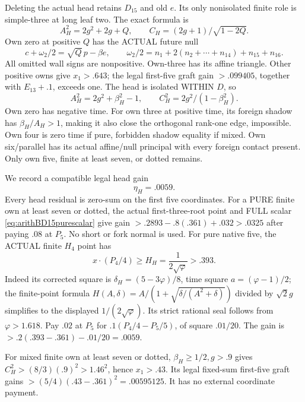 \documentclass[11pt]{article}
\begin{document}
Deleting the actual head retains \(D_{15}\)
and old \(e\).
Its only nonisolated finite role is
simple-three at long leaf two.
The exact formula is
\[
 A_H^2=2g^2+2g+Q,\qquad
                      C_H=(2g+1)/\sqrt{1-2Q}.
\]
Own zero at positive \(Q\) has the
ACTUAL future null
\[
 c+\omega_2/2=\sqrt Q\,p-\beta e,\qquad
 \omega_2/2=n_1+2(n_2+\cdots+n_{14})+n_{15}+n_{16}.
\]
All omitted wall signs are nonpositive.
Own-three has its affine triangle.
Other positive owns give \(x_1>.643\);
the legal first-five graft gain \(>.099405\),
together with \(E_{13}+.1\), exceeds one.
The head is isolated WITHIN \(D\), so
\[
 A_H^2=2g^2+\beta_H^2-1,\qquad
                         C_H^2=2g^2/(1-\beta_H^2).
\]
Own zero has negative time.
For own three at positive time, its
foreign shadow has \(\beta_H/A_H>1\),
making it also close the orthogonal
rank-one edge, impossible.
Own four is zero time if pure, forbidden
shadow equality if mixed.
Own six/parallel has its actual affine/null
principal with every foreign contact present.
Only own five, finite at least seven,
or dotted remains.

We record a compatible legal head gain
\[
                                  \eta_H=.0059 .
\tag{D16OH}\label{eq:arithD16ordinaryheadgain}
\]
Every head residual is zero-sum on the
first five coordinates.
For a PURE finite own at least seven
or dotted, the actual first-three-root
point and FULL scalar
\eqref{eq:arithBD15purescalar} give gain
\(>.2893-.8(.361)+.032>.0325\)
after paying \(.08\) at \(P_5\).
No short or fork normal is used.
For pure native five, the ACTUAL finite
\(H_4\) point has
\[
 x\cdot(P_4/4)\ge H_H={\frac{1}{2\sqrt\varphi}}>.393 .
\]
Indeed its corrected square is
\(\delta_H=(5-3\varphi)/8\),
time square \(a=(\varphi-1)/2\);
the finite-point formula
\(H(A,\delta)=A/(1+\sqrt{\delta/(A^2+\delta)})\)
divided by \(\sqrt2g\) simplifies to
the displayed \(1/(2\sqrt\varphi)\).
Its strict rational seal follows from
\(\varphi>1.618\).
Pay \(.02\) at \(P_5\) for
\(.1(P_4/4-P_5/5)\), of square \(.01/20\).
The gain is \(>.2(.393-.361)-.01/20=.0059\).

For mixed finite own at least seven
or dotted, \(\beta_H\ge1/2,g>.9\)
gives \(C_H^2>(8/3)(.9)^2>1.46^2\),
hence \(x_1>.43\).
Its legal fixed-sum first-five graft
gains \(>(5/4)(.43-.361)^2=.00595125\).
It has no external coordinate payment.
\end{document}
